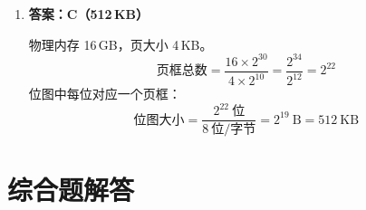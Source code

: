 \documentclass[12pt,a4paper]{ctexart}
\begin{document}
\begin{enumerate}[leftmargin=*]
MMU 地址转换过程包含：TLB 查找、页表查找、访问权限检查、缺页检测等。

\begin{itemize}
\item A：访问越权——MMU 检查页表项中的保护位，属于 MMU 检测范围。
\item B：Cache 缺失——由 Cache 控制器检测和处理，不属于 MMU 的功能。
\item C：页面缺失——MMU 检查页表项中的存在位（P 位），若为 0 则触发缺页异常。
\item D：TLB 缺失——MMU 首先查找 TLB，若未命中即为 TLB 缺失。
\end{itemize}

故选 B。

\item \textbf{答案：C（512\,KB）}

物理内存 16\,GB，页大小 4\,KB。
\[
\text{页框总数} = \frac{16 \times 2^{30}}{4 \times 2^{10}} = \frac{2^{34}}{2^{12}} = 2^{22}
\]
位图中每位对应一个页框：
\[
\text{位图大小} = \frac{2^{22}\ \text{位}}{8\ \text{位/字节}} = 2^{19}\ \mathrm{B} = 512\ \mathrm{KB}
\]

\end{enumerate}

\newpage

\section{综合题解答}
\end{document}
